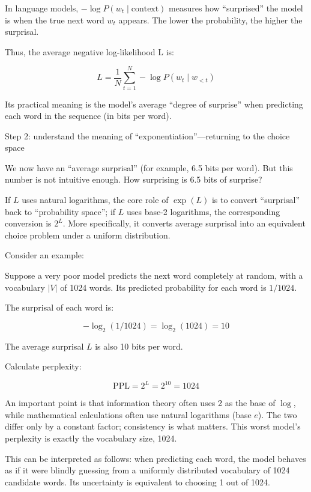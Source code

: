 In language models, \(-\log P(w_t\mid \mathrm{context})\) measures how ``surprised'' the model is when the true next word \(w_t\) appears. The lower the probability, the higher the surprisal.

Thus, the average negative log-likelihood L is:

\[
L=\frac{1}{N}\sum_{t=1}^{N}-\log P(w_t\mid w_{<t})
\]

Its practical meaning is the model's average ``degree of surprise'' when predicting each word in the sequence (in bits per word).

Step 2: understand the meaning of ``exponentiation''---returning to the choice space

We now have an ``average surprisal'' (for example, 6.5 bits per word). But this number is not intuitive enough. How surprising is 6.5 bits of surprise?

If \(L\) uses natural logarithms, the core role of \(\exp(L)\) is to convert ``surprisal'' back to ``probability space''; if \(L\) uses base-2 logarithms, the corresponding conversion is \(2^L\). More specifically, it converts average surprisal into an equivalent choice problem under a uniform distribution.

Consider an example:

Suppose a very poor model predicts the next word completely at random, with a vocabulary \(|V|\) of 1024 words. Its predicted probability for each word is \(1/1024\).

The surprisal of each word is:

\[
-\log_2(1/1024)=\log_2(1024)=10
\]

The average surprisal \(L\) is also 10 bits per word.

Calculate perplexity:

\[
\mathrm{PPL}=2^L=2^{10}=1024
\]

An important point is that information theory often uses 2 as the base of \(\log\), while mathematical calculations often use natural logarithms (base \(e\)). The two differ only by a constant factor; consistency is what matters. This worst model's perplexity is exactly the vocabulary size, 1024.

This can be interpreted as follows: when predicting each word, the model behaves as if it were blindly guessing from a uniformly distributed vocabulary of 1024 candidate words. Its uncertainty is equivalent to choosing 1 out of 1024.

